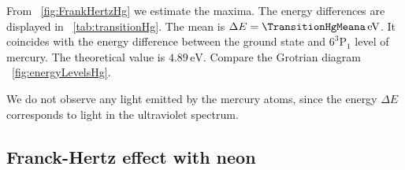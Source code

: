 \documentclass[a4paper,10pt,twocolumn]{article}
\newcommand{\eV}{\, \mathrm{eV}}
\newcommand{\HgLevelA}{6^3\mathrm{P}_1}
\newcommand{\TheoreticalTransitionHga}{4.89}
\begin{document}
    From ~\autoref{fig:FrankHertzHg} we estimate the maxima.
    The energy differences are displayed in ~\autoref{tab:transitionHg}.
    The mean is $\Delta E = \TransitionHgMeana \eV$.
    It coincides with the energy difference between the ground state and $\HgLevelA$ level
    of mercury.
    The theoretical value is $\TheoreticalTransitionHga \eV$.
    Compare the Grotrian diagram ~\autoref{fig:energyLevelsHg}.
    
    We do not observe any light emitted by the mercury atoms, since the energy $\Delta E$ corresponds to light in the
    ultraviolet spectrum.
    
    
    \subsection{Franck-Hertz effect with neon}
    
\end{document}
